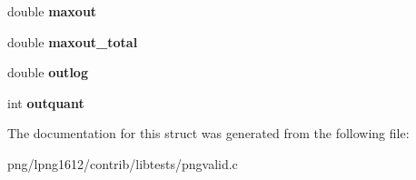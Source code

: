 \begin{DoxyCompactItemize}
\item 
\hypertarget{structvalidate__info_aed4845bbf80e100be4f8298b9ce9afb4}{double {\bfseries maxout}}\label{structvalidate__info_aed4845bbf80e100be4f8298b9ce9afb4}

\item 
\hypertarget{structvalidate__info_a2486c2c76b694c223b66a79848c8baa3}{double {\bfseries maxout\+\_\+total}}\label{structvalidate__info_a2486c2c76b694c223b66a79848c8baa3}

\item 
\hypertarget{structvalidate__info_ab2903c6cbabd9aaf0b40d7147295bcf9}{double {\bfseries outlog}}\label{structvalidate__info_ab2903c6cbabd9aaf0b40d7147295bcf9}

\item 
\hypertarget{structvalidate__info_a3c41e8f5ecdfb94bdb90501a7fff97d8}{int {\bfseries outquant}}\label{structvalidate__info_a3c41e8f5ecdfb94bdb90501a7fff97d8}

\end{DoxyCompactItemize}


The documentation for this struct was generated from the following file\+:\begin{DoxyCompactItemize}
\item 
png/lpng1612/contrib/libtests/pngvalid.\+c\end{DoxyCompactItemize}
